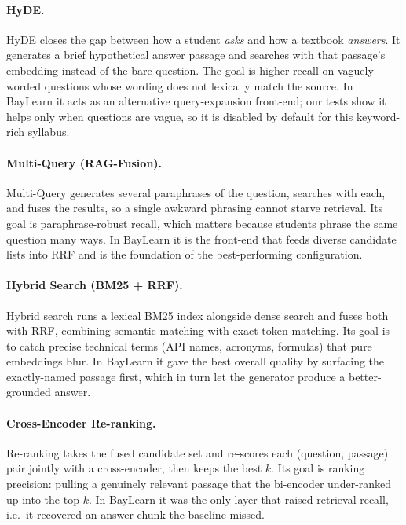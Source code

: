 \documentclass[12pt,a4paper]{report}
\begin{document}
\paragraph{HyDE.}
HyDE closes the gap between how a student \emph{asks} and how a textbook
\emph{answers}. It generates a brief hypothetical answer passage and searches with
that passage's embedding instead of the bare question. The goal is higher recall
on vaguely-worded questions whose wording does not lexically match the source. In
BayLearn it acts as an alternative query-expansion front-end; our tests show it
helps only when questions are vague, so it is disabled by default for this
keyword-rich syllabus.

\paragraph{Multi-Query (RAG-Fusion).}
Multi-Query generates several paraphrases of the question, searches with each, and
fuses the results, so a single awkward phrasing cannot starve retrieval. Its goal
is paraphrase-robust recall, which matters because students phrase the same
question many ways. In BayLearn it is the front-end that feeds diverse candidate
lists into RRF and is the foundation of the best-performing configuration.

\paragraph{Hybrid Search (BM25 + RRF).}
Hybrid search runs a lexical BM25 index alongside dense search and fuses both with
RRF, combining semantic matching with exact-token matching. Its goal is to catch
precise technical terms (API names, acronyms, formulas) that pure embeddings
blur. In BayLearn it gave the best overall quality by surfacing the exactly-named
passage first, which in turn let the generator produce a better-grounded answer.

\paragraph{Cross-Encoder Re-ranking.}
Re-ranking takes the fused candidate set and re-scores each (question, passage)
pair jointly with a cross-encoder, then keeps the best $k$. Its goal is ranking
precision: pulling a genuinely relevant passage that the bi-encoder under-ranked
up into the top-$k$. In BayLearn it was the only layer that raised retrieval
recall, i.e.\ it recovered an answer chunk the baseline missed.
\end{document}
